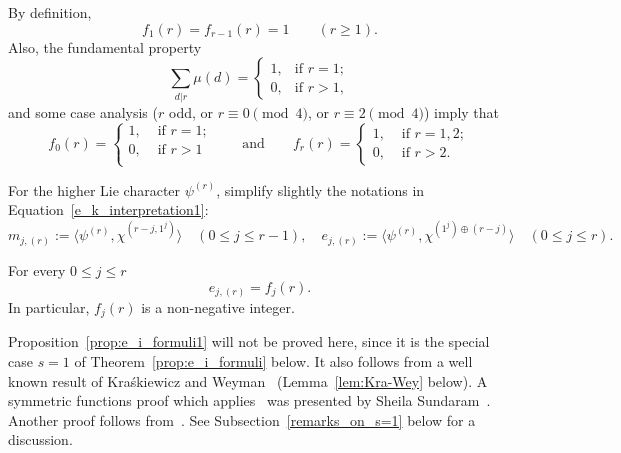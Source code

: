 \begin{observation}\label{obs:f_values}
    By definition, 
    \[
        f_1(r) = f_{r-1}(r) = 1
        \qquad (r \ge 1).
    \]
    Also, the fundamental property
    \[
        \sum_{d|r} \mu(d) = 
        \begin{cases}
            1, &\text{if } r=1; \\
            0, &\text{if } r>1,
        \end{cases}
    \]
    and some case analysis ($r$ odd, or $r \equiv 0 \pmod 4$, or $r \equiv 2 \pmod 4$) imply that
    \[
        f_0(r) = 
        \begin{cases} 
            1,&\text{ if }  r=1;\\
            0,&\text{ if } r>1\\
        \end{cases}
        \qquad \text{and} \qquad
        f_r(r) = 
        \begin{cases} 
            1,&\text{ if }  r=1,2;\\
            0,&\text{ if } r>2.
        \end{cases}
    \]
\end{observation}
      
For the higher Lie character $\psi^{(r)}$, 
simplify slightly the notations in Equation~\eqref{e_k_interpretation1}:
\[
    m_{j,(r)}
    := \langle \psi^{(r)},\chi^{(r-j,1^j)} \rangle 
    \quad (0 \le j \le r-1), \quad
    e_{j,(r)} 
    :=\langle \psi^{(r)},\chi^{(1^j)\oplus(r-j)} \rangle
    \quad (0 \le j \le r).
\]

\begin{proposition}\label{prop:e_i_formuli1}
    For every $0\le j\le r$ 
    \[
        e_{j,(r)} = f_j(r).
    \]
    In particular, $f_j(r)$ is a non-negative integer.
\end{proposition}

\begin{remark}\label{rem:e=s}
    Proposition~\ref{prop:e_i_formuli1} will not be proved here, since it is the special case $s=1$ of Theorem~\ref{prop:e_i_formuli} below. 
    It also follows from a well known result of Kra\'skiewicz and Weyman~\cite{KraskiewiczWeyman} (Lemma~\ref{lem:Kra-Wey} below).
    A symmetric functions proof which applies~\cite[Lemma 2.7]{Sundaram_Adv} was presented by Sheila Sundaram~\cite{Sundaram_personal}. 
    Another proof follows from~\cite[Theorem 3.1]{ET}. 
    See Subsection~\ref{remarks_on_s=1} below for a discussion.
\end{remark}
  
